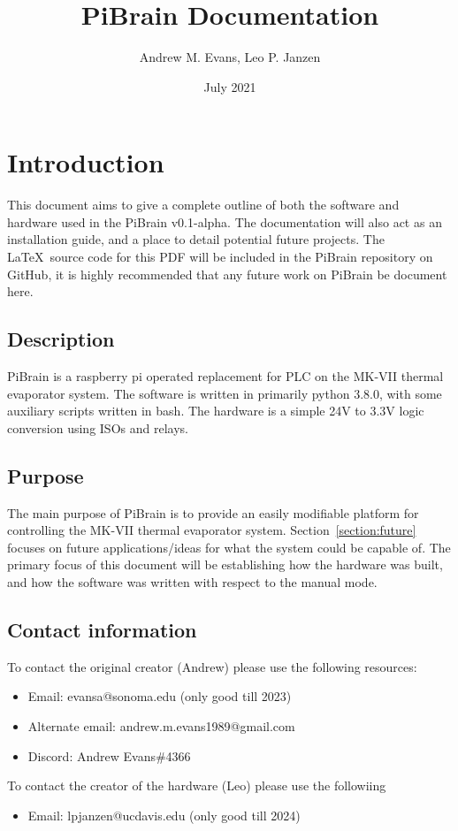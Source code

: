 \documentclass[titlepage]{article}
\title{PiBrain Documentation}
\author{Andrew M. Evans, Leo P. Janzen}
\date{July 2021}
\begin{document}
\maketitle

\tableofcontents

\section{Introduction}
This document aims to give a complete outline of both the software and hardware used in the PiBrain v0.1-alpha. The documentation will also act as an installation guide, and a place to detail potential future projects. The \LaTeX\ source code for this PDF will be included in the PiBrain repository on GitHub, it is highly recommended that any future work on PiBrain be document here.\\

\subsection{Description}
PiBrain is a raspberry pi operated replacement for PLC on the MK-VII thermal evaporator system. The software is written in primarily python 3.8.0, with some auxiliary scripts written in bash. The hardware is a simple 24V to 3.3V logic conversion using ISOs and relays.\\

\subsection{Purpose}
The main purpose of PiBrain is to provide an easily modifiable platform for controlling the MK-VII thermal evaporator system. Section~\ref{section:future} focuses on future applications/ideas for what the system could be capable of. The primary focus of this document will be establishing how the hardware was built, and how the software was written with respect to the manual mode.
\subsection{Contact information}

To contact the original creator (Andrew) please use the following resources:
\begin{itemize}
    \item Email: evansa@sonoma.edu (only good till 2023)
    \item Alternate email: andrew.m.evans1989@gmail.com
    \item Discord: Andrew Evans\#4366
\end{itemize}
To contact the creator of the hardware (Leo) please use the followiing 
\begin{itemize}
    \item Email: lpjanzen@ucdavis.edu (only good till 2024)
\end{itemize}
\end{document}
